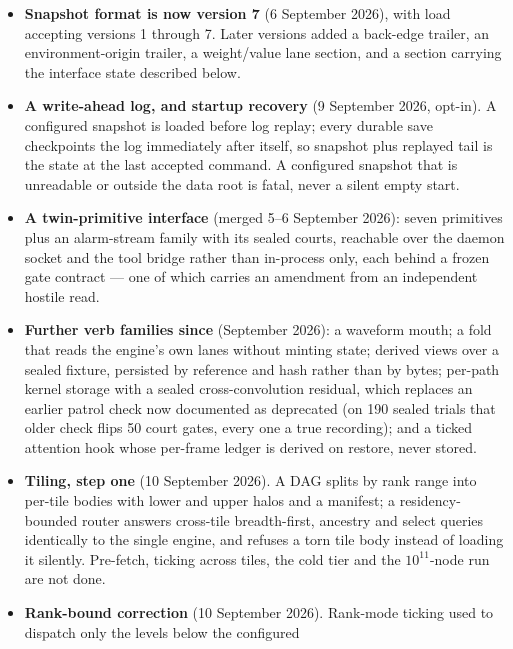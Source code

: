 \documentclass[11pt]{article}
\begin{document}
\begin{itemize}[label={--},leftmargin=1.6em]
        for the tiled stretch target, which needs an address space
        past $2^{32}$.
  \item \textbf{Snapshot format is now version 7} (6 September 2026),
        with load accepting versions 1 through 7. Later versions added
        a back-edge trailer, an environment-origin trailer, a
        weight/value lane section, and a section carrying the
        interface state described below.
  \item \textbf{A write-ahead log, and startup recovery} (9 September
        2026, opt-in). A configured snapshot is loaded before log
        replay; every durable save checkpoints the log immediately
        after itself, so snapshot plus replayed tail is the state at
        the last accepted command. A configured snapshot that is
        unreadable or outside the data root is fatal, never a silent
        empty start.
  \item \textbf{A twin-primitive interface} (merged 5--6 September
        2026): seven primitives plus an alarm-stream family with its
        sealed courts, reachable over the daemon socket and the tool
        bridge rather than in-process only, each behind a frozen gate
        contract --- one of which carries an amendment from an
        independent hostile read.
  \item \textbf{Further verb families since} (September 2026): a
        waveform mouth; a fold that reads the engine's own lanes
        without minting state; derived views over a sealed fixture,
        persisted by reference and hash rather than by bytes; per-path
        kernel storage with a sealed cross-convolution residual, which
        replaces an earlier patrol check now documented as deprecated
        (on 190 sealed trials that older check flips 50 court gates,
        every one a true recording); and a ticked attention hook whose
        per-frame ledger is derived on restore, never stored.
  \item \textbf{Tiling, step one} (10 September 2026). A DAG splits by
        rank range into per-tile bodies with lower and upper halos and
        a manifest; a residency-bounded router answers cross-tile
        breadth-first, ancestry and select queries identically to the
        single engine, and refuses a torn tile body instead of loading
        it silently. Pre-fetch, ticking across tiles, the cold tier
        and the $10^{11}$-node run are not done.
  \item \textbf{Rank-bound correction} (10 September 2026). Rank-mode
        ticking used to dispatch only the levels below the configured

\end{itemize}
\end{document}

